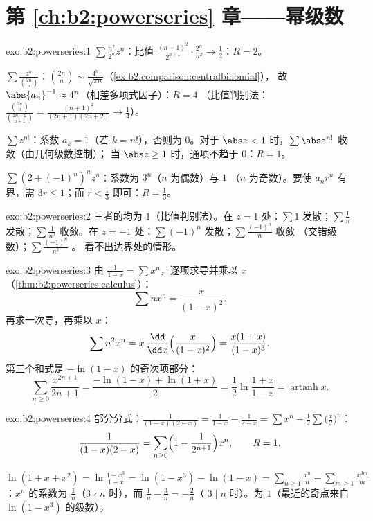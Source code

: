 \section*{第 \ref{ch:b2:powerseries} 章——幂级数}

\begin{solution}{exo:b2:powerseries:1}
$\sum \frac{n^2}{2^n}z^n$：比值 $\frac{(n+1)^2}{2^{n+1}}\cdot
\frac{2^n}{n^2} \to \frac12$：$R = 2$。

$\sum \frac{z^n}{\binom{2n}{n}}$：$\binom{2n}{n} \sim
\frac{4^n}{\sqrt{\pi n}}$（\cref{ex:b2:comparison:centralbinomial}），
故 $\abs{a_n}^{-1} \approx 4^n$（相差多项式因子）：$R = 4$
（比值判别法：$\frac{\binom{2n}{n}}{\binom{2n+2}{n+1}} =
\frac{(n+1)^2}{(2n+1)(2n+2)} \to \frac14$）。

$\sum z^{n!}$：系数 $a_k = 1$（若 $k = n!$），否则为 $0$。对于
$\abs z < 1$ 时，$\sum \abs z^{n!}$ 收敛（由几何级数控制）；
当 $\abs z \geq 1$ 时，通项不趋于 $0$：$R = 1$。

$\sum (2 + (-1)^n)^n z^n$：系数为 $3^n$（$n$ 为偶数）与 $1$
（$n$ 为奇数）。要使 $a_nr^n$ 有界，需 $3r \leq 1$；而 $r <
\frac13$ 即可：$R = \frac13$。
\end{solution}

\begin{solution}{exo:b2:powerseries:2}
三者的均为 $1$（比值判别法）。在 $z = 1$ 处：$\sum 1$
发散；$\sum\frac1n$ 发散；$\sum\frac{1}{n^2}$ 收敛。在
$z = -1$ 处：$\sum(-1)^n$ 发散；$\sum\frac{(-1)^n}{n}$ 收敛
（交错级数）；$\sum\frac{(-1)^n}{n^2}$ 。
看不出边界处的情形。
\end{solution}

\begin{solution}{exo:b2:powerseries:3}
由 $\frac{1}{1-x} = \sum x^n$，逐项求导并乘以 $x$
（\cref{thm:b2:powerseries:calculus}）：
\[
\sum n x^n = \frac{x}{(1-x)^2} .
\]
再求一次导，再乘以 $x$：
\[
\sum n^2 x^n = x\,\frac{\dd}{\dd x}\Bigl(\frac{x}{(1-x)^2}\Bigr)
= \frac{x(1 + x)}{(1-x)^3} .
\]
第三个和式是 $-\ln(1 - x)$ 的奇次项部分：
\[
\sum_{n\geq0} \frac{x^{2n+1}}{2n+1}
= \frac{-\ln(1-x) + \ln(1+x)}{2}
= \frac12 \ln\frac{1+x}{1-x}
= \operatorname{artanh} x .
\]
\end{solution}

\begin{solution}{exo:b2:powerseries:4}
部分分式：$\frac{1}{(1-x)(2-x)} = \frac{1}{1-x} -
\frac{1}{2 - x} = \sum x^n - \frac12\sum \bigl(\frac x2\bigr)^n$：
\[
\frac{1}{(1-x)(2-x)} = \sum_{n\geq0} \Bigl(1 -
\frac{1}{2^{n+1}}\Bigr)x^n,
\qquad R = 1 .
\]

$\ln(1 + x + x^2) = \ln\frac{1 - x^3}{1 - x} = \ln(1 - x^3) -
\ln(1 - x) = \sum_{n\geq1}\frac{x^n}{n} -
\sum_{m\geq1}\frac{x^{3m}}{m}$：$x^n$ 的系数为
$\frac1n$（$3 \nmid n$ 时），而 $\frac1n - \frac{3}{n} = -\frac2n$（
$3 \mid n$ 时）。为 $1$（最近的奇点来自
$\ln(1-x^3)$ 的级数）。
\end{solution}

